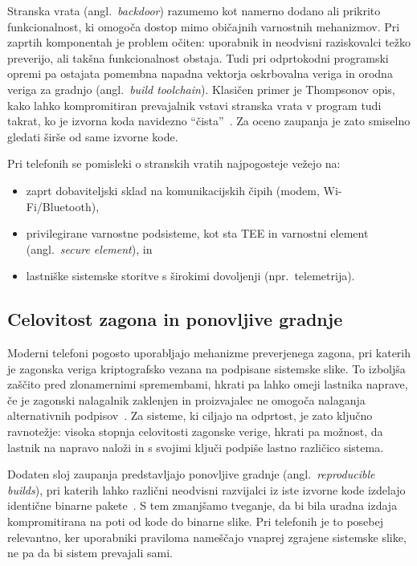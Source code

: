 \documentclass[a4paper,12pt,openright]{book}
\begin{document}
Stranska vrata (angl.~\textit{backdoor}) razumemo kot namerno dodano ali prikrito funkcionalnost, ki omogoča dostop mimo običajnih varnostnih mehanizmov.
Pri zaprtih komponentah je problem očiten: uporabnik in neodvisni raziskovalci težko preverijo, ali takšna funkcionalnost obstaja.
Tudi pri odprtokodni programski opremi pa ostajata pomembna napadna vektorja oskrbovalna veriga in orodna veriga za gradnjo (angl.~\textit{build toolchain}).
Klasičen primer je Thompsonov opis, kako lahko kompromitiran prevajalnik vstavi stranska vrata v program tudi takrat, ko je izvorna koda navidezno \enquote{čista}~\cite{thompson_trusting_trust}.
Za oceno zaupanja je zato smiselno gledati širše od same izvorne kode.

Pri telefonih se pomisleki o stranskih vratih najpogosteje vežejo na:
\begin{itemize}
  \item zaprt dobaviteljski sklad na komunikacijskih čipih (modem, Wi-Fi/Bluetooth),
  \item privilegirane varnostne podsisteme, kot sta TEE in varnostni element (angl.~\textit{secure element}), in
  \item lastniške sistemske storitve s širokimi dovoljenji (npr.~telemetrija).
\end{itemize}

\subsection{Celovitost zagona in ponovljive gradnje}
\label{subsec:teorija_supply_chain}

Moderni telefoni pogosto uporabljajo mehanizme preverjenega zagona, pri katerih je zagonska veriga kriptografsko vezana na podpisane sistemske slike.
To izboljša zaščito pred zlonamernimi spremembami, hkrati pa lahko omeji lastnika naprave, če je zagonski nalagalnik zaklenjen in proizvajalec ne omogoča nalaganja alternativnih podpisov~\cite{android_verified_boot}.
Za sisteme, ki ciljajo na odprtost, je zato ključno ravnotežje: visoka stopnja celovitosti zagonske verige, hkrati pa možnost, da lastnik na napravo naloži in s svojimi ključi podpiše lastno različico sistema.

Dodaten sloj zaupanja predstavljajo ponovljive gradnje (angl.~\textit{reproducible builds}), pri katerih lahko različni neodvisni razvijalci iz iste izvorne kode izdelajo identične binarne pakete~\cite{reproducible_builds}.
S tem zmanjšamo tveganje, da bi bila uradna izdaja kompromitirana na poti od kode do binarne slike.
Pri telefonih je to posebej relevantno, ker uporabniki praviloma nameščajo vnaprej zgrajene sistemske slike, ne pa da bi sistem prevajali sami.
\end{document}
